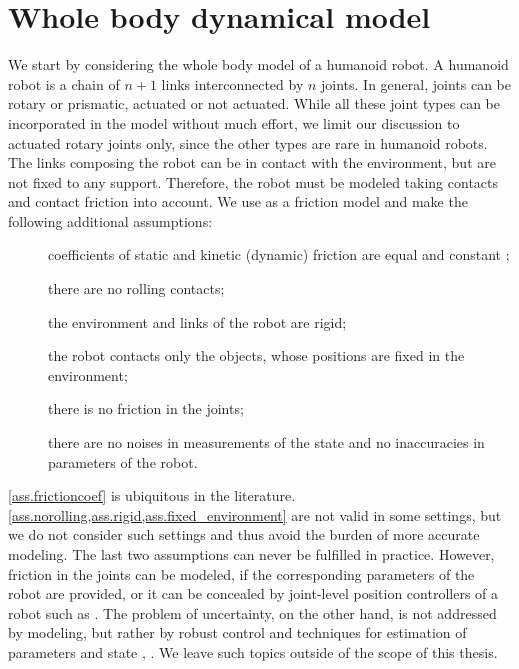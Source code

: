 \section{Whole body dynamical model}\label{sec.whole_body_model}

We start by considering the whole body model of a humanoid robot. A humanoid
robot is a chain of $n+1$ links interconnected by $n$ joints. In general,
joints can be rotary or prismatic, actuated or not actuated. While all these
joint types can be incorporated in the model without much effort, we limit our
discussion to actuated rotary joints only, since the other types are rare in
humanoid robots. The links composing the robot can be in contact with the
environment, but are not fixed to any support. Therefore, the robot must be
modeled taking contacts and contact friction into account. We use  as a friction model \cite[Chapter~10]{Popov2010contact} and make the
following additional assumptions:
%
\begin{description}
    \item[] coefficients of static and kinetic (dynamic)
        friction are equal and constant \cite[Chapter~10]{Popov2010contact};
    \item[] there are no rolling contacts;
    \item[] the environment and links of the robot are rigid;
    \item[] the robot contacts only the objects,
        whose positions are fixed in the environment;
    \item[] there is no friction in the joints;
    \item[] there are no noises in measurements of the
        state and no inaccuracies in parameters of the robot.
\end{description}
%
\cref{ass.frictioncoef} is ubiquitous in the literature.
\cref{ass.norolling,ass.rigid,ass.fixed_environment} are not valid in some
settings, but we do not consider such settings and thus avoid the burden of
more accurate modeling. The last two assumptions can never be fulfilled in
practice. However, friction in the joints can be modeled, if the corresponding
parameters of the robot are provided, or it can be concealed by joint-level
position controllers of a robot such as  \cite{Kaneko2004icra}. The
problem of uncertainty, on the other hand, is not addressed by modeling, but
rather by robust control and techniques for estimation of parameters and state
\cite[Chapter~8]{Siciliano2010robotics}, \cite{Christensen2008handbook}. We
leave such topics outside of the scope of this thesis.


